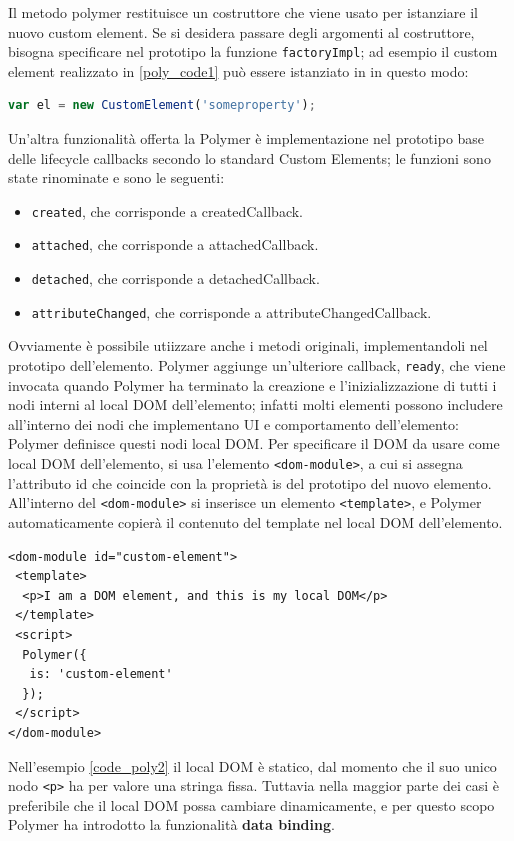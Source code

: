 Il metodo polymer restituisce un costruttore che viene usato per istanziare il nuovo custom element. Se si desidera passare degli argomenti al costruttore, bisogna specificare nel prototipo la funzione \texttt{factoryImpl}; ad esempio il custom element realizzato in \ref{poly_code1} può essere istanziato in in questo modo:
\begin{lstlisting}[language=JavaScript]
var el = new CustomElement('someproperty');
\end{lstlisting}
Un’altra funzionalità offerta la Polymer è implementazione nel prototipo base delle lifecycle callbacks secondo lo standard Custom Elements; le funzioni sono state rinominate e sono le seguenti:
\begin{itemize}
\item \texttt{created}, che corrisponde a createdCallback.
\item \texttt{attached}, che corrisponde a attachedCallback.
\item \texttt{detached}, che corrisponde a detachedCallback.
\item \texttt{attributeChanged}, che corrisponde a attributeChangedCallback.
\end{itemize}
Ovviamente è possibile utiizzare anche i metodi originali, implementandoli nel prototipo dell’elemento. Polymer aggiunge un’ulteriore callback, \texttt{ready}, che viene invocata quando Polymer ha terminato la creazione e l’inizializzazione di tutti i nodi interni al local DOM dell’elemento; infatti molti elementi possono includere all’interno dei nodi che implementano UI e comportamento dell’elemento: Polymer definisce questi nodi local DOM.
Per specificare il DOM da usare come local DOM dell’elemento, si usa l’elemento \texttt{<dom-module>}, a cui si assegna l’attributo id che coincide con la proprietà is del prototipo del nuovo elemento. All’interno del \texttt{<dom-module>} si inserisce un elemento \texttt{<template>}, e Polymer automaticamente copierà il contenuto del template nel local DOM dell’elemento.
\begin{lstlisting}[language=HTML5,label={code_poly2}]
<dom-module id="custom-element">
 <template>
  <p>I am a DOM element, and this is my local DOM</p>
 </template>
 <script>
  Polymer({
   is: 'custom-element'
  });
 </script>
</dom-module>
\end{lstlisting}
Nell’esempio \ref{code_poly2} il local DOM è statico, dal momento che il suo unico nodo \texttt{<p>} ha per valore una stringa fissa. Tuttavia nella maggior parte dei casi è preferibile che il local DOM possa cambiare dinamicamente, e per questo scopo Polymer ha introdotto la funzionalità \textbf{data binding}. 
